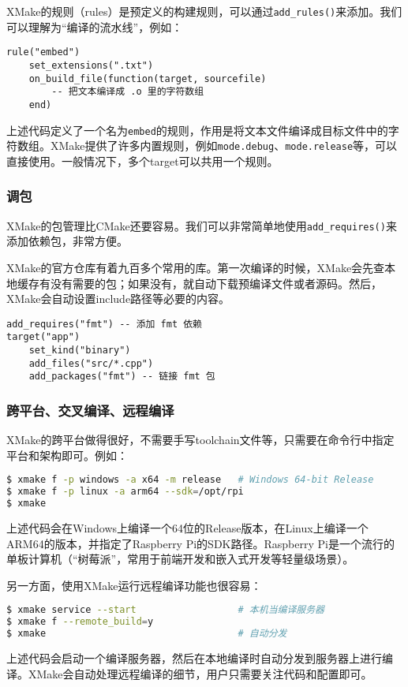 XMake的规则（rules）是预定义的构建规则，可以通过\texttt{add\_rules()}来添加。我们可以理解为“编译的流水线”，例如：
\begin{lstlisting}
rule("embed")
    set_extensions(".txt")
    on_build_file(function(target, sourcefile)
        -- 把文本编译成 .o 里的字符数组
    end)
\end{lstlisting}
上述代码定义了一个名为\texttt{embed}的规则，作用是将文本文件编译成目标文件中的字符数组。XMake提供了许多内置规则，例如\texttt{mode.debug}、\texttt{mode.release}等，可以直接使用。一般情况下，多个target可以共用一个规则。

\subsubsection{调包}

XMake的包管理比CMake还要容易。我们可以非常简单地使用\texttt{add\_requires()}来添加依赖包，非常方便。

XMake的官方仓库有着九百多个常用的库。第一次编译的时候，XMake会先查本地缓存有没有需要的包；如果没有，就自动下载预编译文件或者源码。然后，XMake会自动设置include路径等必要的内容。

\begin{lstlisting}
add_requires("fmt") -- 添加 fmt 依赖
target("app")
    set_kind("binary")
    add_files("src/*.cpp")
    add_packages("fmt") -- 链接 fmt 包
\end{lstlisting}

\subsubsection{跨平台、交叉编译、远程编译}

XMake的跨平台做得很好，不需要手写toolchain文件等，只需要在命令行中指定平台和架构即可。例如：
\begin{lstlisting}[language=bash]
$ xmake f -p windows -a x64 -m release   # Windows 64-bit Release
$ xmake f -p linux -a arm64 --sdk=/opt/rpi
$ xmake
\end{lstlisting}
上述代码会在Windows上编译一个64位的Release版本，在Linux上编译一个ARM64的版本，并指定了Raspberry Pi的SDK路径。Raspberry Pi是一个流行的单板计算机（“树莓派”，常用于前端开发和嵌入式开发等轻量级场景）。

另一方面，使用XMake运行远程编译功能也很容易：
\begin{lstlisting}[language=bash]
$ xmake service --start                  # 本机当编译服务器
$ xmake f --remote_build=y
$ xmake                                  # 自动分发
\end{lstlisting}
上述代码会启动一个编译服务器，然后在本地编译时自动分发到服务器上进行编译。XMake会自动处理远程编译的细节，用户只需要关注代码和配置即可。

